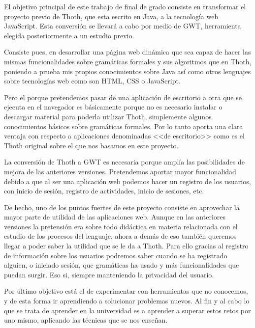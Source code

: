 
El objetivo principal de este trabajo de final de grado consiste en transformar el proyecto previo de Thoth, que esta escrito en Java, a la tecnología web JavaScript. Esta conversión se llevará a cabo por medio de GWT, herramienta elegida posteriormente a un estudio previo. 

Consiste pues, en desarrollar una página web dinámica que sea capaz de hacer las mismas funcionalidades sobre gramáticas formales y sus algoritmos que en Thoth, poniendo a prueba mis propios conocimientos sobre Java así como otros lenguajes sobre tecnologías web como son HTML, CSS o JavaScript.

Pero el porque pretendemos pasar de una aplicación de escritorio a otra que se ejecuta en el navegador es básicamente porque no es necesario instalar o descargar material para poderla utilizar Thoth, simplemente algunos conocimientos básicos sobre gramáticas formales. Por lo tanto aporta una clara ventaja con respecto a aplicaciones denominadas <<de escritorio>> como es el Thoth original sobre el que nos basamos en este proyecto.

La conversión de Thoth a GWT es necesaria porque amplía las posibilidades de mejora de las anteriores versiones. Pretendemos aportar mayor funcionalidad debido a que al ser una aplicación web podemos hacer un registro de los usuarios, con inicio de sesión, registro de actividades, inicio de sesiones, etc. 

De hecho, uno de los puntos fuertes de este proyecto consiste en aprovechar la mayor parte de utilidad de las aplicaciones web. Aunque en las anteriores versiones la pretensión era sobre todo didáctica en materia relacionada con el estudio de los procesos del lenguaje, ahora a demás de eso también queremos llegar a poder saber la utilidad que se le da a Thoth. Para ello gracias al registro de información sobre los usuarios podremos saber cuando se ha registrado alguien, o iniciado sesión, que gramáticas ha usado y más funcionalidades que puedan surgir. Eso si, siempre manteniendo la privacidad del usuario.

Por último objetivo está el de experimentar con herramientas que no conocemos, y de esta forma ir aprendiendo a solucionar problemas nuevos. Al fin y al cabo lo que se trata de aprender en la universidad es a aprender a superar estos retos por uno mismo, aplicando las técnicas que se nos enseñan.